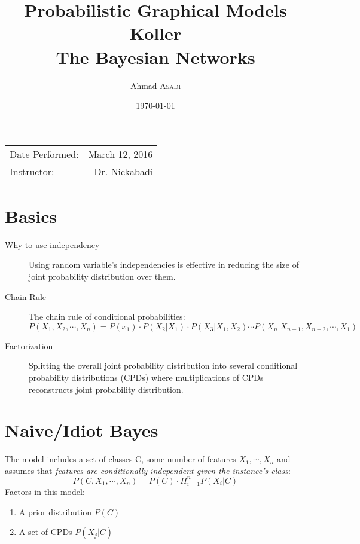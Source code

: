 \documentclass{article}
\title{Probabilistic Graphical Models\\Koller\\The Bayesian Networks} %
\author{Ahmad \textsc{Asadi}} %
\date{\today} %
\begin{document}
\maketitle %

\begin{center}
\begin{tabular}{l r}
Date Performed: & March 12, 2016 \\ %
Instructor: & Dr. Nickabadi %
\end{tabular}
\end{center}



\section{Basics}
\begin{description}
\item[Why to use independency] Using random variable's independencies is effective in reducing the size of joint probability distribution over them.
\item[Chain Rule] The chain rule of conditional probabilities:
\begin{equation}
	P(X_1, X_2, \cdots, X_n) = P(x_1)\cdot P(X_2|X_1)\cdot P(X_3|X_1, X_2) \cdots P(X_n|X_{n-1}, X_{n-2}, \cdots, X_1) 
\end{equation}
\item[Factorization] Splitting the overall joint probability distribution into several conditional probability distributions (CPDs) where multiplications of CPDs reconstructs joint probability distribution.

\end{description}

\section{Naive/Idiot Bayes}
The model includes a set of classes C, some number of features $X_1,\cdots,X_n$ and assumes that \textit{features are conditionally independent given the instance's class}:\\
\begin{equation}
P(C,X_1,\cdots,X_n) = P(C)\cdot \Pi_{i=1}^n P(X_i|C)
\end{equation}
Factors in this model:
\begin{enumerate}
\item A prior distribution $P(C)$
\item A set of CPDs $P(X_j|C)$
\end{enumerate}
\end{document}
